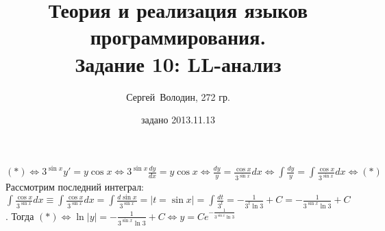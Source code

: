 \documentclass[a4paper]{article}
\title{Теория и реализация языков программирования.\\Задание 10: LL-анализ}
\date{задано 2013.11.13}
\author{Сергей~Володин, 272 гр.}
\begin{document}
$(*)\Leftrightarrow 3^{\sin x}y'=y\cos x\Leftrightarrow 3^{\sin x}\frac{dy}{dx}=y\cos x\Leftrightarrow \frac{dy}{y}=\frac{\cos x}{3^{\sin x}}dx\Leftrightarrow \int\frac{dy}{y}=\int\frac{\cos x}{3^{\sin x}}dx\Leftrightarrow(*)$\newline
Рассмотрим последний интеграл: $\int\frac{\cos x}{3^{\sin x}}dx\equiv\int\frac{\cos x}{3^{\sin x}}dx=\int\frac{d\sin x}{3^{\sin x}}=|t=\sin x|=\int\frac{dt}{3^t}=-\frac{1}{3^t\ln 3}+C=-\frac{1}{3^{\sin x}\ln 3}+C$.\newline
Тогда $(*)\Leftrightarrow \ln|y|=-\frac{1}{3^{\sin x}\ln 3}+C\Leftrightarrow y=C e^{-\frac{1}{3^{\sin x}\ln 3}}$
\end{document}
